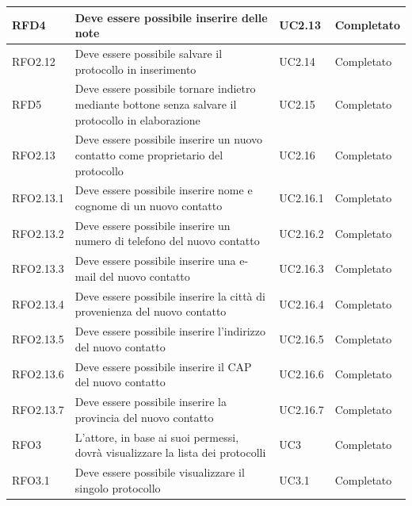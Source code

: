 \begin{longtable}{| p{3cm} | p{6cm} | p{3cm} | p{3cm} |}
        RFD4 & Deve essere possibile inserire delle note & UC2.13 & Completato
        \\ \hline
        
        RFO2.12 & Deve essere possibile salvare il protocollo in inserimento & UC2.14 & Completato
        \\ \hline
        
        RFD5 & Deve essere possibile tornare indietro mediante bottone senza salvare il protocollo in elaborazione & UC2.15 & Completato
        \\ \hline
        
        RFO2.13 & Deve essere possibile inserire un nuovo contatto come proprietario del protocollo & UC2.16 & Completato
        \\ \hline
        
        RFO2.13.1 & Deve essere possibile inserire nome e cognome di un nuovo contatto & UC2.16.1 & Completato
        \\ \hline
        
        RFO2.13.2 & Deve essere possibile inserire un numero di telefono del nuovo contatto & UC2.16.2 & Completato
        \\ \hline
        
        RFO2.13.3 & Deve essere possibile inserire una e-mail del nuovo contatto & UC2.16.3 & Completato
        \\ \hline
        
        RFO2.13.4 & Deve essere possibile inserire la città di provenienza del nuovo contatto & UC2.16.4 & Completato
        \\ \hline
        
        RFO2.13.5 & Deve essere possibile inserire l'indirizzo del nuovo contatto & UC2.16.5 & Completato
        \\ \hline
        
        RFO2.13.6 & Deve essere possibile inserire il CAP del nuovo contatto & UC2.16.6 & Completato
        \\ \hline
        
        RFO2.13.7 & Deve essere possibile inserire la provincia del nuovo contatto & UC2.16.7 & Completato
        \\ \hline
        
        RFO3 & L'attore, in base ai suoi permessi, dovrà visualizzare la lista dei protocolli & UC3 & Completato
        \\ \hline
        
        RFO3.1 & Deve essere possibile visualizzare il singolo protocollo & UC3.1 & Completato
        \\ \hline
        

\end{longtable}
